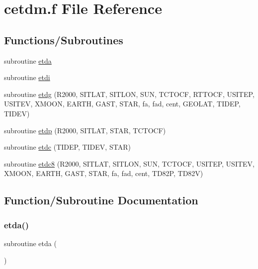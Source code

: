 \hypertarget{cetdm_8f}{}\section{cetdm.\+f File Reference}
\label{cetdm_8f}
\subsection*{Functions/\+Subroutines}
\begin{DoxyCompactItemize}
\item 
subroutine \hyperlink{cetdm_8f_aff1097c8c225199b67b47d47f9018104}{etda}
\item 
subroutine \hyperlink{cetdm_8f_afc9e45a1757356472ae9754f34245dbd}{etdi}
\item 
subroutine \hyperlink{cetdm_8f_af308956ff45f6d291f0f8e9da8e81c54}{etdg} (R2000, S\+I\+T\+L\+AT, S\+I\+T\+L\+ON, S\+UN, T\+C\+T\+O\+CF, R\+T\+T\+O\+CF, U\+S\+I\+T\+EP, U\+S\+I\+T\+EV, X\+M\+O\+ON, E\+A\+R\+TH, G\+A\+ST, S\+T\+AR, fa, fad, cent, G\+E\+O\+L\+AT, T\+I\+D\+EP, T\+I\+D\+EV)
\item 
subroutine \hyperlink{cetdm_8f_adb3cbf5a50a988616633ce79011c32e8}{etdp} (R2000, S\+I\+T\+L\+AT, S\+T\+AR, T\+C\+T\+O\+CF)
\item 
subroutine \hyperlink{cetdm_8f_a9cc2587e6a72834bb4057ff69cac4e6e}{etdc} (T\+I\+D\+EP, T\+I\+D\+EV, S\+T\+AR)
\item 
subroutine \hyperlink{cetdm_8f_a6de6ec5ec80148a5251387f7f3ddcd80}{etdc8} (R2000, S\+I\+T\+L\+AT, S\+I\+T\+L\+ON, S\+UN, T\+C\+T\+O\+CF, U\+S\+I\+T\+EP, U\+S\+I\+T\+EV, X\+M\+O\+ON, E\+A\+R\+TH, G\+A\+ST, S\+T\+AR, fa, fad, cent, T\+D82P, T\+D82V)
\end{DoxyCompactItemize}


\subsection{Function/\+Subroutine Documentation}
\mbox{\label{cetdm_8f_aff1097c8c225199b67b47d47f9018104}} 
\subsubsection{\texorpdfstring{etda()}{etda()}}
{\footnotesize\ttfamily subroutine etda (\begin{DoxyParamCaption}{ }\end{DoxyParamCaption})}



